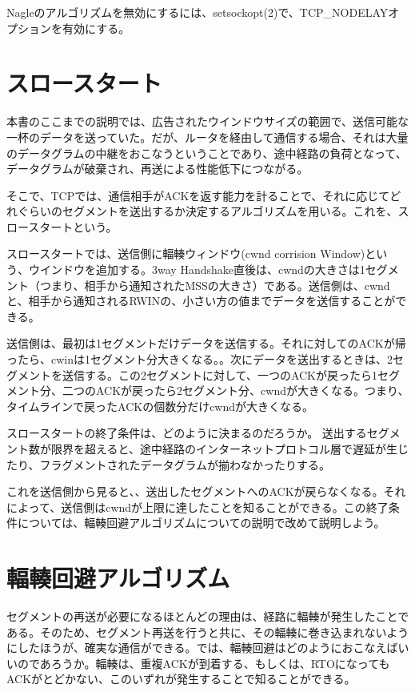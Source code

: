 Nagleのアルゴリズムを無効にするには、setsockopt(2)で、TCP\_NODELAYオプションを有効にする。

\section{スロースタート}

本書のここまでの説明では、広告されたウインドウサイズの範囲で、送信可能な一杯のデータを送っていた。だが、ルータを経由して通信する場合、それは大量のデータグラムの中継をおこなうということであり、途中経路の負荷となって、データグラムが破棄され、再送による性能低下につながる。

そこで、TCPでは、通信相手がACKを返す能力を計ることで、それに応じてどれぐらいのセグメントを送出するか決定するアルゴリズムを用いる。これを、スロースタートという。

スロースタートでは、送信側に輻輳ウィンドウ(cwnd corrision Window)という、ウインドウを追加する。3way Handshake直後は、cwndの大きさは1セグメント（つまり、相手から通知されたMSSの大きさ）である。送信側は、cwndと、相手から通知されるRWINの、小さい方の値までデータを送信することができる。

送信側は、最初は1セグメントだけデータを送信する。それに対してのACKが帰ったら、cwinは1セグメント分大きくなる。。次にデータを送出するときは、2セグメントを送信する。この2セグメントに対して、一つのACKが戻ったら1セグメント分、二つのACKが戻ったら2セグメント分、cwndが大きくなる。つまり、タイムラインで戻ったACKの個数分だけcwndが大きくなる。

スロースタートの終了条件は、どのように決まるのだろうか。
送出するセグメント数が限界を超えると、途中経路のインターネットプロトコル層で遅延が生じたり、フラグメントされたデータグラムが揃わなかったりする。

これを送信側から見ると、、送出したセグメントへのACKが戻らなくなる。それによって、送信側はcwndが上限に達したことを知ることができる。この終了条件については、輻輳回避アルゴリズムについての説明で改めて説明しよう。

\section{輻輳回避アルゴリズム}

セグメントの再送が必要になるほとんどの理由は、経路に輻輳が発生したことである。そのため、セグメント再送を行うと共に、その輻輳に巻き込まれないようにしたほうが、確実な通信ができる。では、輻輳回避はどのようにおこなえばいいのであろうか。輻輳は、重複ACKが到着する、もしくは、RTOになってもACKがとどかない、このいずれが発生することで知ることができる。

